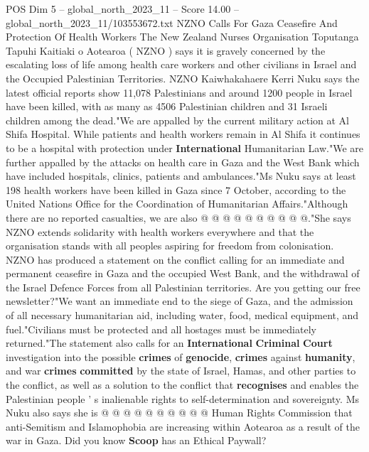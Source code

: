 \begin{textsample}{POS Dim 5 – global\_north\_2023\_11 – Score 14.00 – global\_north\_2023\_11/103553672.txt}  \label{ex:f5_pos_415}
NZNO Calls For Gaza Ceasefire And Protection Of Health Workers The New Zealand Nurses Organisation Toputanga Tapuhi Kaitiaki o Aotearoa ( NZNO ) says it is gravely concerned by the escalating loss of life among health care workers and other civilians in Israel and the Occupied Palestinian Territories.
NZNO Kaiwhakahaere Kerri Nuku says the latest official reports show 11,078 Palestinians and around 1200 people in Israel have been killed, with as many as 4506 Palestinian children and 31 Israeli children among the dead."We are appalled by the current military action at Al Shifa Hospital.
While patients and health workers remain in Al Shifa it continues to be a hospital with protection under \textbf{International} Humanitarian Law."We are further appalled by the attacks on health care in Gaza and the West Bank which have included hospitals, clinics, patients and ambulances."Ms Nuku says at least 198 health workers have been killed in Gaza since 7 October, according to the United Nations Office for the Coordination of Humanitarian Affairs."Although there are no reported casualties, we are also @ @ @ @ @ @ @ @ @ @."She says NZNO extends solidarity with health workers everywhere and that the organisation stands with all peoples aspiring for freedom from colonisation.
NZNO has produced a statement on the conflict calling for an immediate and permanent ceasefire in Gaza and the occupied West Bank, and the withdrawal of the Israel Defence Forces from all Palestinian territories.
Are you getting our free newsletter?"We want an immediate end to the siege of Gaza, and the admission of all necessary humanitarian aid, including water, food, medical equipment, and fuel."Civilians must be protected and all hostages must be immediately returned."The statement also calls for an \textbf{International} \textbf{Criminal} \textbf{Court} investigation into the possible \textbf{crimes} of \textbf{genocide}, \textbf{crimes} against \textbf{humanity}, and war \textbf{crimes} \textbf{committed} by the state of Israel, Hamas, and other parties to the conflict, as well as a solution to the conflict that \textbf{recognises} and enables the Palestinian people ' s inalienable rights to self-determination and sovereignty.
Ms Nuku also says she is @ @ @ @ @ @ @ @ @ @ Human Rights Commission that anti-Semitism and Islamophobia are increasing within Aotearoa as a result of the war in Gaza.
Did you know \textbf{Scoop} has an Ethical Paywall?

\end{textsample}
